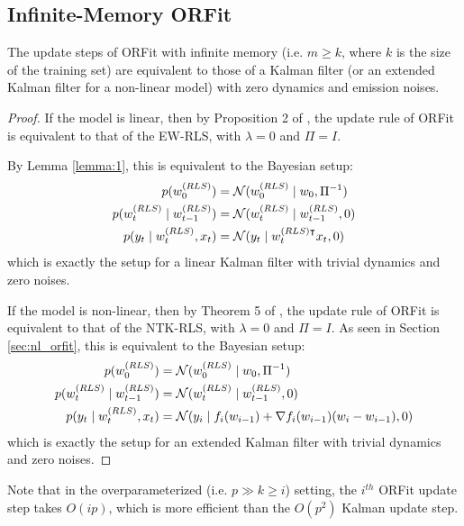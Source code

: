 \subsection{Infinite-Memory ORFit}
\begin{theorem}
\label{thm:1}
    The update steps of ORFit with infinite memory 
    (i.e. $m \geq k$, where $k$ is the size of the training set)
    are equivalent to those of a Kalman filter (or an extended 
    Kalman filter for a non-linear model) with zero dynamics 
    and emission noises.
\end{theorem}

\begin{proof}
    If the model is linear, then by Proposition 2 of \cite{ORFit},
    the update rule of ORFit is equivalent to that of the EW-RLS,
    with $\lambda = 0$ and $\Pi = I$.

    By Lemma \ref{lemma:1}, this is equivalent to the Bayesian setup:
    \begin{align}
        p(w_0^{(RLS)}) &= \mathcal{N}(w_0^{(RLS)} \mid w_0, \Pi^{-1}) \\
        p(w_t^{(RLS)} \mid w_{t-1}^{(RLS)}) &= \mathcal{N}(w_t^{(RLS)} \mid w_{t-1}^{(RLS)}, 0) \\
        p(y_t \mid w_t^{(RLS)}, x_t) &= \mathcal{N}(y_t \mid w_t^{(RLS)\intercal}x_t, 0)
    \end{align}
    which is exactly the setup for a linear Kalman filter with trivial dynamics and zero noises.

    If the model is non-linear, then by Theorem 5 of \cite{ORFit}, 
    the update rule of ORFit is equivalent to that of the NTK-RLS,
    with $\lambda = 0$ and $\Pi = I$.
    As seen in Section \ref{sec:nl_orfit}, this is equivalent to the Bayesian setup:
    \begin{align}
        p(w_0^{(RLS)}) &= \mathcal{N}(w_0^{(RLS)} \mid w_0, \Pi^{-1}) \\
        p(w_t^{(RLS)} \mid w_{t-1}^{(RLS)}) &= \mathcal{N}(w_t^{(RLS)} \mid w_{t-1}^{(RLS)}, 0) \\
        p(y_t \mid w_t^{(RLS)}, x_t) &= \mathcal{N}(y_i \mid f_i(w_{i-1}) + \nabla f_i(w_{i-1}) (w_i - w_{i-1}), 0)
    \end{align}
    which is exactly the setup for an extended Kalman filter with trivial dynamics and zero noises.
\end{proof}

Note that in the overparameterized (i.e. $p \gg k \geq i$) setting, the $i^{th}$ ORFit update
step takes $O(ip)$, which is more efficient than the $O(p^2)$ Kalman update step.

